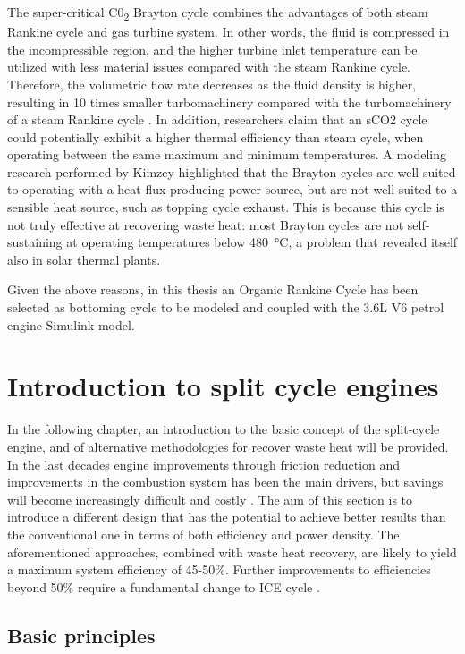 The super-critical C0\textsubscript{2} Brayton cycle combines the advantages of both steam Rankine cycle and gas turbine system. In other words, the fluid is compressed in the incompressible region, and the higher turbine inlet temperature can be utilized with less material issues compared with the steam Rankine cycle. Therefore, the volumetric flow rate decreases as the fluid density is higher, resulting in 10 times smaller turbomachinery compared with the turbomachinery of a steam Rankine cycle \cite{Ahn2015}. In addition, researchers claim \cite{Kimzey2012} that an sCO2 cycle could potentially exhibit a higher thermal efficiency than steam cycle, when operating between the same maximum and minimum temperatures. A modeling research performed by Kimzey \cite{Kimzey2012} highlighted that the Brayton cycles are well suited to operating with a heat flux producing power source, but are not well suited to a sensible heat source, such as topping cycle exhaust. This is because this cycle is not truly effective at recovering waste heat: most Brayton cycles are not self-sustaining at operating temperatures below \SI{480}{\celsius}, a problem that revealed itself also in solar thermal plants. 

Given the above reasons, in this thesis an Organic Rankine Cycle has been selected as bottoming cycle to be modeled and coupled with the 3.6L V6 petrol engine Simulink model.

\section{Introduction to split cycle engines}

In the following chapter, an introduction to the basic concept of the split-cycle engine, and of alternative methodologies for recover waste heat will be provided. In the last decades engine improvements through friction reduction and improvements in the combustion system has been the main drivers, but savings will become increasingly difficult and costly \cite{Stanton2013}. The aim of this section is to introduce a different design that has the potential to achieve better results than the conventional one in terms of both efficiency and power density. The aforementioned approaches, combined with waste heat recovery, are likely to yield a maximum system efficiency of 45-50\%. Further improvements to efficiencies beyond 50\% require a fundamental change to ICE cycle \cite{Dong2015}.

\subsection{Basic principles}

